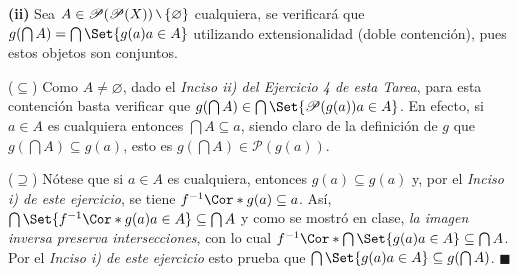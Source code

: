 \documentclass[12pt]{article}
\providecommand\given{}
\renewcommand{\emptyset}{\varnothing}
\newcounter{A}
\newcommand{\mysetminusD}{\hbox{\tikz{\draw[line width=0.6pt,line cap=round] (3pt,0) -- (0,6pt);}}}
\newcommand{\mysetminusT}{\mysetminusD}
\newcommand{\mysetminusS}{\hbox{\tikz{\draw[line width=0.45pt,line cap=round] (2pt,0) -- (0,4pt);}}}
\newcommand{\mysetminusSS}{\hbox{\tikz{\draw[line width=0.4pt,line cap=round] (1.5pt,0) -- (0,3pt);}}}
\newcommand{\mysetminus}{\mathbin{\mathchoice{\mysetminusD}{\mysetminusT}{\mysetminusS}{\mysetminusSS}}}
\renewcommand{\setminus}{\mysetminus}
\newcommand{\QED}{\hfill\ensuremath{\blacksquare}}
\begin{document}
    \textbf{(ii)} Sea $A \in \mathscr{P}(\mathscr{P}(X)) \setminus \{\emptyset\}$ cualquiera, se verificará que $g(\bigcap A)=\bigcap \Set{g(a) \given a \in A}$ utilizando extensionalidad (doble contención), pues estos objetos son conjuntos.

    (\(\subseteq\)) Como \(A \neq \emptyset\), dado el \textit{Inciso ii) del Ejercicio 4 de esta Tarea}, para esta contención basta verificar que \(g(\bigcap A) \in \bigcap\Set{\mathscr{P}(g(a)) \given a \in A} \). En efecto, si \(a \in A\) es cualquiera entonces \(\bigcap A \subseteq a\), siendo claro de la definición de \(g\) que \(g(\bigcap A) \subseteq g(a)\), esto es \(g(\bigcap A) \in \mathscr{P}(g(a))\).

    (\(\supseteq\)) Nótese que si \(a \in A\) es cualquiera, entonces \(g(a) \subseteq g(a)\) y, por el \textit{Inciso i) de este ejercicio}, se tiene \(f^{-1}\Cor*{g(a)} \subseteq a\). Así, \(\bigcap \Set{ f^{-1}\Cor*{ g(a) } \given a \in A} \subseteq \bigcap A \) y como se mostró en clase, \textit{la imagen inversa preserva intersecciones}, con lo cual \(f^{-1}\Cor*{\bigcap \Set{g(a) \given a \in A}} \subseteq \bigcap A \). Por el \textit{Inciso i) de este ejercicio} esto prueba que \(\bigcap \Set{g(a) \given a \in A} \subseteq g(\bigcap A)\). \QED 
\end{document}
